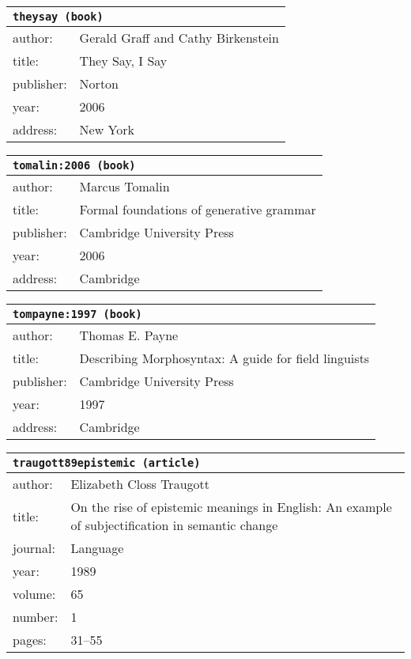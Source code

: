 \documentclass{article}
\begin{document}
\bigskip

\begin{tabular}{p{}p{}}
\multicolumn{2}{l}{\texttt{theysay (book)}}\\
\hline
author: & Gerald Graff and Cathy Birkenstein\\
title: & They {S}ay, {I} {S}ay\\
publisher: & Norton\\
year: & 2006\\
address: & New York\\
\end{tabular}

\bigskip

\begin{tabular}{p{}p{}}
\multicolumn{2}{l}{\texttt{tomalin:2006 (book)}}\\
\hline
author: & Marcus Tomalin\\
title: & Formal foundations of generative grammar\\
publisher: & Cambridge University Press\\
year: & 2006\\
address: & Cambridge\\
\end{tabular}

\bigskip

\begin{tabular}{p{}p{}}
\multicolumn{2}{l}{\texttt{tompayne:1997 (book)}}\\
\hline
author: & Thomas E. Payne\\
title: & Describing Morphosyntax: A guide for field linguists\\
publisher: & Cambridge University Press\\
year: & 1997\\
address: & Cambridge\\
\end{tabular}

\bigskip

\begin{tabular}{p{}p{}}
\multicolumn{2}{l}{\texttt{traugott89epistemic (article)}}\\
\hline
author: & Elizabeth Closs Traugott\\
title: & On the rise of epistemic meanings in English: An example of subjectification in semantic change\\
journal: & Language\\
year: & 1989\\
volume: & 65\\
number: & 1\\
pages: & 31--55\\
\end{tabular}
\end{document}
